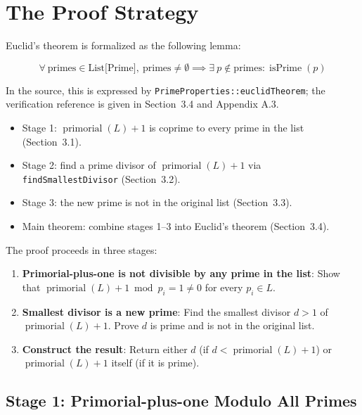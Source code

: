\section{The Proof Strategy}
\label{sec:proof-strategy}

Euclid's theorem is formalized as the following lemma:

\begin{equation*}
\forall\ \text{primes} \in \text{List[Prime]},\ \text{primes} \neq \emptyset \implies
\exists\ p \notin \text{primes} : \operatorname{isPrime}(p)
\end{equation*}

In the source, this is expressed by \texttt{PrimeProperties::euclidTheorem};
the verification reference is given in Section~3.4 and Appendix A.3.

\begin{itemize}
  \item Stage 1: $\operatorname{primorial}(L)+1$ is coprime to every prime
    in the list (Section~3.1).
  \item Stage 2: find a prime divisor of $\operatorname{primorial}(L)+1$
    via \texttt{findSmallestDivisor} (Section~3.2).
  \item Stage 3: the new prime is not in the original list (Section~3.3).
  \item Main theorem: combine stages 1--3 into Euclid's theorem
    (Section~3.4).
\end{itemize}

The proof proceeds in three stages:

\begin{enumerate}
  \item \textbf{Primorial-plus-one is not divisible by any prime in the
    list}: Show that $\operatorname{primorial}(L) + 1 \bmod p_i = 1 \neq 0$
    for every $p_i \in L$.
  \item \textbf{Smallest divisor is a new prime}: Find the smallest
    divisor $d > 1$ of $\operatorname{primorial}(L) + 1$. Prove $d$ is
    prime and is not in the original list.
  \item \textbf{Construct the result}: Return either $d$ (if
    $d < \operatorname{primorial}(L) + 1$) or
    $\operatorname{primorial}(L) + 1$ itself (if it is prime).
\end{enumerate}

\subsection{Stage 1: Primorial-plus-one Modulo All Primes}
\label{sec:stage-1}

